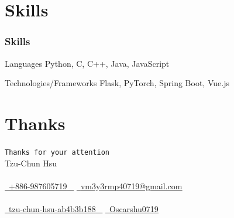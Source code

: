 \documentclass{beamer}
\begin{document}



\section{Skills}
\begin{frame}
    \frametitle{Skills}
    \begin{block}{Languages}
        Python, C, C++, Java, JavaScript
    \end{block}
    \begin{block}{Technologies/Frameworks}
        Flask, PyTorch, Spring Boot, Vue.js
    \end{block}
\end{frame}

\section{Thanks}
\begin{frame}
    \begin{center}
        \huge{\texttt{Thanks for your attention}} \\
        \Huge{Tzu-Chun Hsu} \\~\\
        \scriptsize{
            \href{tel:+886-987605719}{ \raisebox{-0.1\height}\faPhone\ \underline{+886-987605719} ~} 
            \href{mailto:vm3y3rmp40719@gmail.com}{\raisebox{-0.2\height}\faEnvelope\  \underline{vm3y3rmp40719@gmail.com}} \\~\\
            \href{https://www.linkedin.com/in/tzu-chun-hsu-ab4b3b188/}{\raisebox{-0.2\height}\faLinkedinSquare\ \underline{tzu-chun-hsu-ab4b3b188} ~}
            \href{https://github.com/Oscarshu0719}{\raisebox{-0.2\height}\faGithub\ \underline{Oscarshu0719}}
        }
    \end{center}
\end{frame}
\end{document}
